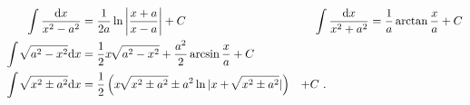 \documentclass[zihao=-4,linespread=1.8,UTF8,nothm]{aytony_base}
\theoremstyle{definition}
\begin{document}
\begin{appendices}
$$\begin{aligned}
            \int \dfrac{\mathrm{d}x}{x^2 - a^2}            & = \dfrac{1}{2a}\ln \left|\dfrac{x+a}{x-a}\right| + C                                         & \int \dfrac{\mathrm{d}x}{x^2 + a^2}              & = \dfrac{1}{a}\arctan \dfrac{x}{a} + C \\
            \int \,\sqrt[]{a^2 - x^2}\mathrm{d}x           & = \dfrac{1}{2}x \,\sqrt[]{a^2 - x^2} + \dfrac{a^2}{2}\arcsin \dfrac{x}{a} + C                                                                                                            \\
            \int \,\sqrt[]{x^2 \pm a^2}\mathrm{d}x         & = \dfrac{1}{2}\left(x \,\sqrt[]{x^2 \pm a^2} \pm a^2 \ln |x + \,\sqrt[]{x^2 \pm a^2}|\right) & + C\ .  \hspace{1.3cm}
        \end{aligned}
    $$

\end{appendices}
\end{document}
